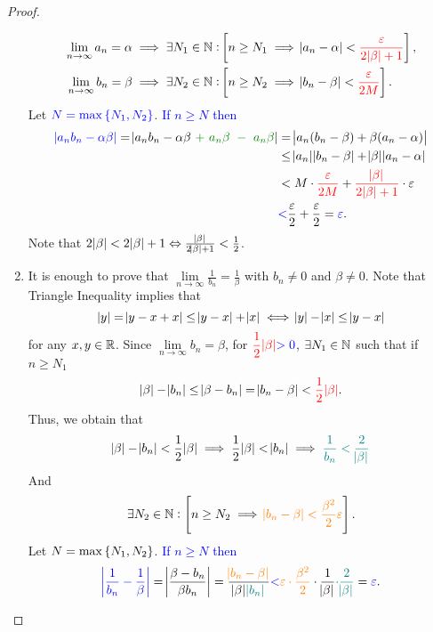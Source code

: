 \documentclass[11pt,openany]{article}
\begin{document}
\begin{proof}
\begin{enumerate}[(1)]
\begin{align*}
		\lim\limits_{n\to\infty}a_n=\alpha\implies\exists N_1\in\mathbb{N}:&\left[n\geq N_1\implies\abs{a_n-\alpha}<\textcolor{red}{\frac{\varepsilon}{2\abs{\beta}+1}}\right],\\ \lim\limits_{n\to\infty}b_n=\beta\implies\exists N_2\in\mathbb{N}:&\left[n\geq N_2\implies\abs{b_n-\beta}<\textcolor{red}{\frac{\varepsilon}{2M}}\right].
	\end{align*} Let $\textcolor{blue}{N=\max\set{N_1,N_2}}$. \textcolor{blue}{If $n\geq N$ then} \begin{align*}
		\textcolor{blue}{\abs{a_nb_n-\alpha\beta}}=\abs{a_nb_n-\alpha\beta\ \textcolor{green!50!black}{+\ a_n\beta\ -\ a_n\beta}}&=\abs{a_n(b_n-\beta)+\beta(a_n-\alpha)}\\
		&\leq\abs{a_n}\abs{b_n-\beta}+\abs{\beta}\abs{a_n-\alpha}\\
		&<M\cdot\textcolor{red}{\frac{\varepsilon}{2M}}+\textcolor{red}{\frac{\abs{\beta}}{2\abs{\beta}+1}}\cdot\varepsilon\\
		&\textcolor{blue}{<}\frac{\varepsilon}{2}+\frac{\varepsilon}{2}=\textcolor{blue}{\varepsilon}.
	\end{align*} \textcolor{gray!50}{Note that $2\abs{\beta}<2\abs{\beta}+1\Leftrightarrow\frac{\abs{\beta}}{2\abs{\beta}+1}<\frac{1}{2}$.}
	\item It is enough to prove that $\displaystyle\lim\limits_{n\to\infty}\frac{1}{b_n}=\frac{1}{\beta}$ with $b_n\neq 0$ and $\beta\neq 0$. Note that Triangle Inequality implies that \[
	\abs{y}=\abs{y-x+x}\leq\abs{y-x}+\abs{x}\iff\abs{y}-\abs{x}\leq\abs{y-x}
	\] for any $x,y\in\mathbb{R}$. Since $\lim\limits_{n\to\infty}b_n=\beta$, for $\displaystyle\textcolor{red}{\frac{1}{2}\abs{\beta}}\textcolor{blue}{>0}$, $\exists N_1\in\mathbb{N}$ such that if $n\geq N_1$ \[
	\abs{\beta}-\abs{b_n}\leq\abs{\beta-b_n}=\abs{b_n-\beta}<\textcolor{red}{\frac{1}{2}\abs{\beta}}.
	\] Thus, we obtain that \[
	\abs{\beta}-\abs{b_n}<\frac{1}{2}\abs{\beta}\implies\frac{1}{2}\abs{\beta}<\abs{b_n}\implies\textcolor{teal}{\frac{1}{b_n}<\frac{2}{\abs{\beta}}}
	\] And \[
	\exists N_2\in\mathbb{N}:\left[n\geq N_2\implies\textcolor{orange}{\abs{b_n-\beta}<\frac{\beta^2}{2}\varepsilon}\right].
	\] Let \textcolor{blue}{$N=\max\set{N_1,N_2}$}. \textcolor{blue}{If $n\geq N$ then} \[
	\textcolor{blue}{\abs{\frac{1}{b_n}-\frac{1}{\beta}}}=\abs{\frac{\beta-b_n}{\beta b_n}}=\frac{\textcolor{orange}{\abs{b_n-\beta}}}{\abs{\beta}\textcolor{teal}{\abs{b_n}}}\textcolor{blue}{<}\textcolor{orange}{\varepsilon\cdot\frac{\beta^2}{2}}\cdot\frac{1}{\abs{\beta}}\textcolor{teal}{\cdot\frac{2}{\abs{\beta}}}=\textcolor{blue}{\varepsilon}.
	\]
\end{enumerate}
\end{proof}
\end{document}
